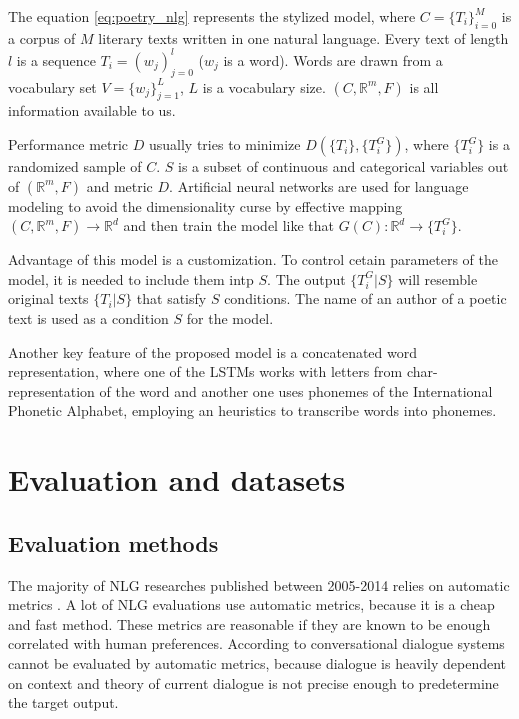 The equation \ref{eq:poetry_nlg} represents the stylized model, where $C = \{ T_i\}^M_{i=0}$ is a corpus of $M$ literary texts written in one natural language. Every text of length $l$ is a sequence $T_i = (w_j)^l_{j=0}$ ($w_j$ is a word). Words are drawn from a vocabulary set $V = \{ w_j \}^L_{j=1}$, $L$ is a vocabulary size. $(C, \mathbb{R}^m, F)$ is all information available to us.

Performance metric $D$ usually tries to minimize $D(\{T_i\}, \{T_i^G\})$, where $\{T_i^G\}$ is a randomized sample of $C$. $S$ is a subset of continuous and categorical variables out of $(\mathbb{R}^m, F)$ and metric $D$. Artificial neural networks are used for language modeling to avoid the dimensionality curse by effective mapping $(C,\mathbb{R}^m, F) \rightarrow \mathbb{R}^d$ and then train the model like that $G(C):\mathbb{R}^d \rightarrow \{ T_i^G\}$. 

Advantage of this model is a customization. To control cetain parameters of the model, it is needed to include them intp $S$. The output $\{T_i^G|S\}$ will resemble original texts $\{T_i|S\}$ that satisfy $S$ conditions. The name of an author of a poetic text is used as a condition $S$ for the model. 

Another key feature of the proposed model is a concatenated word representation, where one of the LSTMs works with letters from char-representation of the word and another one uses phonemes of the International Phonetic Alphabet, employing an heuristics to transcribe words into phonemes.
 
\chapter{Evaluation and datasets} \label{eval_datasets_section}
\section{Evaluation methods}\label{eval}
The majority of NLG researches published between 2005-2014 relies on automatic metrics \cite{gkatzia2015snapshot}. A lot of NLG evaluations use automatic metrics, because it is a cheap and fast method. These metrics are reasonable if they are known to be enough correlated with human preferences. According to \cite{artstein2009semi} conversational dialogue systems cannot be evaluated by automatic metrics, because dialogue is heavily dependent on context and theory of current dialogue is not precise enough to predetermine the target output.  

